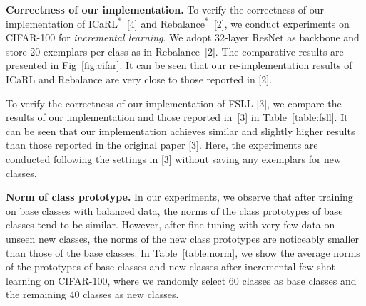 \documentclass{article}
\begin{document}
\textbf{Correctness of our implementation.}
To verify the correctness of our implementation of ICaRL\textsuperscript{$\ast$}~[4] and Rebalance\textsuperscript{$\ast$}~[2], we conduct experiments on CIFAR-100 for \emph{incremental learning}. We adopt 32-layer ResNet as backbone and store 20 exemplars per class as in Rebalance~[2]. The comparative results are presented in Fig~\ref{fig:cifar}. It can be seen that
our re-implementation results of ICaRL and Rebalance are very close to those reported in [2]. 

\begin{table*}[t]
\renewcommand\arraystretch{1.0}
\caption{Our re-implementation results of FSLL are very close to those reported in~[3] on CIFAR-100 for 5-way 5-shot incremental learning. \textsuperscript{$\ast$} indicates our re-implementation. The results are obtained without saving any exemplars.} 
\label{table:fsll}
\centering
{}
\end{table*} 
To verify the correctness of our implementation of FSLL [3], we compare the results of our implementation and those reported in~[3] in Table~\ref{table:fsll}. It can be seen that our implementation achieves similar and slightly higher results than those reported in the original paper [3]. Here, the experiments are conducted following the settings in [3] without saving any exemplars for new classes. 

\textbf{Norm of class prototype.} In our experiments, we observe that after training on base classes with balanced data, the norms of the class prototypes of base classes tend to be similar. However, after fine-tuning with very few data on unseen new classes, the norms of the new class prototypes are noticeably smaller than those of the base classes. In Table~\ref{table:norm}, we show the average norms of the prototypes of base classes and new classes after incremental few-shot learning on CIFAR-100, where we randomly select 60 classes as base classes and the remaining 40 classes as new classes.
\end{document}
